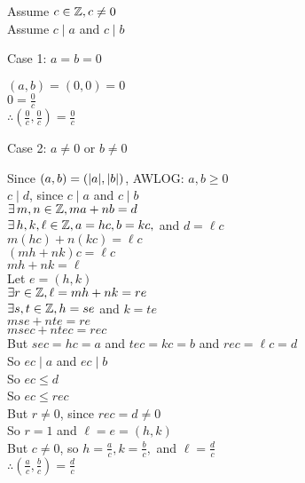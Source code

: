 \documentclass[letterpaper,12pt,fleqn]{article}
\begin{document}
\begin{theproof}
  Assume $c\in\mathbb{Z},c\ne0$ \\
  Assume $c\mid a$ and $c\mid b$

  \begin{description}
  \item{Case 1: $a=b=0$}

    $(a,b)=(0,0)=0$ \\
    $0=\frac{0}{c}$ \\
    $\therefore (\frac{0}{c},\frac{0}{c})=\frac{0}{c}$

  \item{Case 2: $a\ne0$ or $b\ne0$}

    Since $(a,b)=(\lvert a\rvert,\lvert b\rvert)$, AWLOG: $a,b\ge0$ \\
    $c\mid d$, since $c\mid a $ and $c\mid b$ \\
    $\exists\,m,n\in\mathbb{Z},ma+nb=d$ \\
    $\exists\,h,k,\ell\in\mathbb{Z},a=hc,b=kc,$ and $d=\ell c$ \\
    $m(hc)+n(kc)=\ell c$ \\
    $(mh+nk)c=\ell c$ \\
    $mh+nk=\ell$ \\
    Let $e=(h,k)$ \\
    $\exists r\in\mathbb{Z},\ell=mh+nk=re$ \\
    $\exists s,t\in\mathbb{Z},h=se$ and $k=te$ \\
    $mse+nte=re$ \\
    $msec+ntec=rec$ \\
    But $sec=hc=a$ and $tec=kc=b$ and $rec=\ell c=d$ \\
    So $ec\mid a$ and $ec\mid b$ \\
    So $ec\le d$ \\
    So $ec\le rec$ \\
    But $r\ne0$, since $rec=d\ne0$ \\
    So $r=1$ and $\ell=e=(h,k)$ \\
    But $c\ne0$, so $h=\frac{a}{c},k=\frac{b}{c},$ and $\ell=\frac{d}{c}$ \\
    $\therefore (\frac{a}{c},\frac{b}{c})=\frac{d}{c}$
  \end{description}
\end{theproof}
\end{document}
